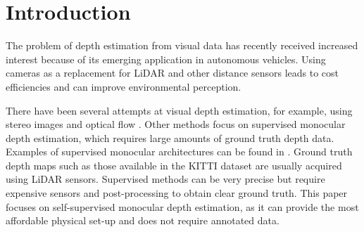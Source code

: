 \documentclass[conference]{IEEEtran}
\begin{document}
\section{Introduction}


The problem of depth estimation from visual data has recently received increased interest because of its emerging application in autonomous vehicles.
Using cameras as a replacement for LiDAR and other distance sensors leads to cost efficiencies and can improve environmental perception. 

There have been several attempts at visual depth estimation, for example, using stereo images \cite{godard2017unsupervised, chang2018pyramid, li2019stereo} and optical flow \cite{ilg2017flownet, wang2018occlusion}. Other methods focus on supervised monocular depth estimation, which requires large amounts of ground truth depth data. Examples of supervised monocular architectures can be found in \cite{bhat2021adabins, song2021monocular, ranftl2021vision}. Ground truth depth maps such as those available in the KITTI dataset \cite{geiger2013vision} are usually acquired using LiDAR sensors. Supervised methods can be very precise but require expensive sensors and post-processing to obtain clear ground truth. This paper focuses on self-supervised monocular depth estimation, as it can provide the most affordable physical set-up and does not require annotated data.
\end{document}
